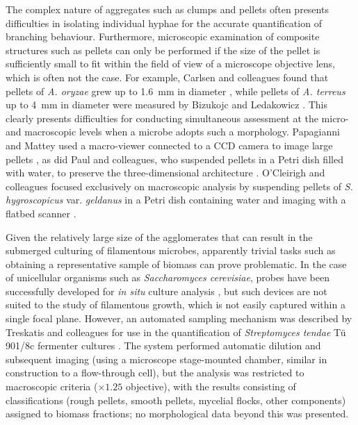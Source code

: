 The complex nature of aggregates such as clumps and pellets often presents difficulties in isolating individual hyphae for the accurate quantification of branching behaviour. Furthermore, microscopic examination of composite structures such as pellets can only be performed if the size of the pellet is sufficiently small to fit within the field of view of a microscope objective lens, which is often not the case. For example, Carlsen and colleagues found that pellets of \emph{A. oryzae} grew up to 1.6~mm in diameter \cite{carlsen1996a}, while pellets of \emph{A. terreus} up to 4~mm in diameter were measured by Bizukojc and Ledakowicz \cite{bizukojc2009}. This clearly presents difficulties for conducting simultaneous assessment at the micro- and macroscopic levels when a microbe adopts such a morphology. Papagianni and Mattey used a macro-viewer connected to a CCD camera to image large pellets \cite{papagianni2004}, as did Paul and colleagues, who suspended pellets in a Petri dish filled with water, to preserve the three-dimensional architecture \cite{paul1999}. O'Cleirigh and colleagues focused exclusively on macroscopic analysis by suspending pellets of \emph{S. hygroscopicus} var. \emph{geldanus} in a Petri dish containing water and imaging with a flatbed scanner \cite{ocleirigh2003}.

Given the relatively large size of the agglomerates that can result in the submerged culturing of filamentous microbes, apparently trivial tasks such as obtaining a representative sample of biomass can prove problematic. In the case of unicellular organisms such as \emph{Saccharomyces cerevisiae}, probes have been successfully developed for \emph{in situ} culture analysis \cite{wei2007}, but such devices are not suited to the study of filamentous growth, which is not easily captured within a single focal plane. However, an automated sampling mechanism was described by Treskatis and colleagues for use in the quantification of \emph{Streptomyces tendae} T\"{u} 901/8c fermenter cultures \cite{treskatis1997}. The system performed automatic dilution and subsequent imaging (using a microscope stage-mounted chamber, similar in construction to a flow-through cell), but the analysis was restricted to macroscopic criteria ($\times 1.25$ objective), with the results consisting of classifications (rough pellets, smooth pellets, mycelial flocks, other components) assigned to biomass fractions; no morphological data beyond this was presented.

